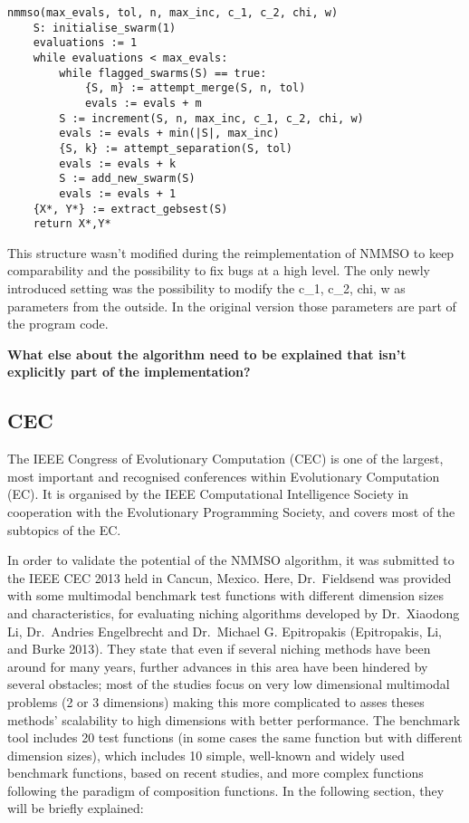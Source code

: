 \documentclass[12pt,a4paper]{article}
\begin{document}
\begin{verbatim}
nmmso(max_evals, tol, n, max_inc, c_1, c_2, chi, w)
    S: initialise_swarm(1)
    evaluations := 1
    while evaluations < max_evals:
        while flagged_swarms(S) == true:
            {S, m} := attempt_merge(S, n, tol)
            evals := evals + m
        S := increment(S, n, max_inc, c_1, c_2, chi, w)
        evals := evals + min(|S|, max_inc)
        {S, k} := attempt_separation(S, tol)
        evals := evals + k
        S := add_new_swarm(S)
        evals := evals + 1
    {X*, Y*} := extract_gebsest(S)
    return X*,Y*
\end{verbatim}

This structure wasn't modified during the reimplementation of NMMSO to
keep comparability and the possibility to fix bugs at a high level. The
only newly introduced setting was the possibility to modify the c\_1,
c\_2, chi, w as parameters from the outside. In the original version
those parameters are part of the program code.

\textbf{What else about the algorithm need to be explained that isn't
explicitly part of the implementation?}

\subsection{CEC}\label{cec}

The IEEE Congress of Evolutionary Computation (CEC) is one of the
largest, most important and recognised conferences within Evolutionary
Computation (EC). It is organised by the IEEE Computational Intelligence
Society in cooperation with the Evolutionary Programming Society, and
covers most of the subtopics of the EC.

In order to validate the potential of the NMMSO algorithm, it was
submitted to the IEEE CEC 2013 held in Cancun, Mexico. Here,
Dr.~Fieldsend was provided with some multimodal benchmark test functions
with different dimension sizes and characteristics, for evaluating
niching algorithms developed by Dr.~Xiaodong Li, Dr.~Andries Engelbrecht
and Dr.~Michael G. Epitropakis (Epitropakis, Li, and Burke 2013). They
state that even if several niching methods have been around for many
years, further advances in this area have been hindered by several
obstacles; most of the studies focus on very low dimensional multimodal
problems (2 or 3 dimensions) making this more complicated to asses
theses methods' scalability to high dimensions with better performance.
The benchmark tool includes 20 test functions (in some cases the same
function but with different dimension sizes), which includes 10 simple,
well-known and widely used benchmark functions, based on recent studies,
and more complex functions following the paradigm of composition
functions. In the following section, they will be briefly explained:
\end{document}

